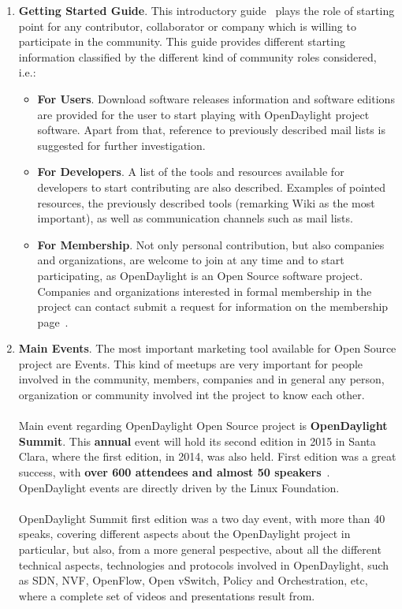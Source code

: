 \documentclass[a4paper, 12pt]{book}
\begin{document}
\begin{enumerate}
\item{\textbf{Getting Started Guide}}. This introductory guide~\cite{OpenDaylightStGuide} plays the role of starting point for any contributor, collaborator or company which is willing to participate in the community. This guide provides different starting information classified by the different kind of community roles considered, i.e.:
\begin{itemize}\itemsep0pt
\item{\textbf{For Users}}. Download software releases information and software editions are provided for the user to start playing with OpenDaylight project software. Apart from that, reference to previously described mail lists is suggested for further investigation.
\item{\textbf{For Developers}}. A list of the tools and resources available for developers to start contributing are also described. Examples of pointed resources, the previously described tools (remarking Wiki as the most important), as well as communication channels such as mail lists.
\item{\textbf{For Membership}}. Not only personal contribution, but also companies and organizations, are welcome  to join at any time and to start participating, as OpenDaylight is an Open Source software project. Companies and organizations interested in formal membership in the project can contact submit a request for information on the membership page~\cite{OpenDaylightJoin}.
\end{itemize}
\item{\textbf{Main Events}}. The most important marketing tool available for Open Source project are Events. This kind of meetups are very important for people involved in the community, members, companies and in general any person, organization or community involved int the project to know each other.\\
\\
Main event regarding OpenDaylight Open Source project is \textbf{OpenDaylight Summit}. This \textbf{annual} event will hold its second edition in 2015 in Santa Clara, where the first edition, in 2014, was also held. First edition was a great success, with \textbf{over 600 attendees and almost 50 speakers}~\cite{OpenDaylight2014Summit}. OpenDaylight events are directly driven by the Linux Foundation.\\
\\
OpenDaylight Summit first edition was a two day event, with more than 40 speaks, covering different aspects about the OpenDaylight project in particular, but also, from a more general pespective, about all the different technical aspects, technologies and protocols involved in OpenDaylight, such as SDN, NVF, OpenFlow, Open vSwitch, Policy and Orchestration, etc, where a complete set of videos and presentations result from.\\

\end{enumerate}
\end{document}
